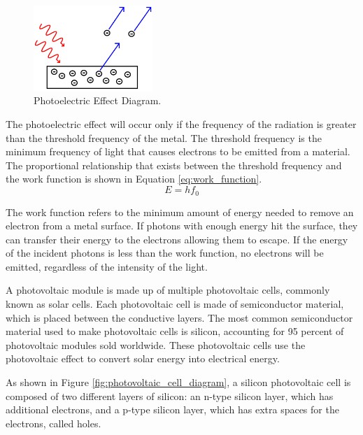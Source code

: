 \begin{figure}[ht]
    \centering
    \includegraphics[width=0.4\textwidth]{Figures/photoelectric_effect_diagram.png}
    \caption{Photoelectric Effect Diagram. \cite{KhanAcademyPhotoelectricEffect}}
    \label{fig:photoelectric_effect_diagram}
\end{figure}
\FloatBarrier

\noindent The photoelectric effect will occur only if the frequency of the radiation is greater than the threshold frequency of the metal. The threshold frequency is the minimum frequency of light that causes electrons to be emitted from a material. The proportional relationship that exists between the threshold frequency and the work function is shown in Equation \ref{eq:work_function}.
\begin{equation}
    E = hf_0
    \label{eq:work_function}
\end{equation}

\noindent The work function refers to the minimum amount of energy needed to remove an electron from a metal surface. If photons with enough energy hit the surface, they can transfer their energy to the electrons allowing them to escape. If the energy of the incident photons is less than the work function, no electrons will be emitted, regardless of the intensity of the light. \cite{ScienceABC2023PhotoelectricBeginners}\vspace{0.5em}

\noindent A photovoltaic module is made up of multiple photovoltaic cells, commonly known as solar cells. Each photovoltaic cell is made of semiconductor material, which is placed between the conductive layers. The most common semiconductor material used to make photovoltaic cells is silicon, accounting for 95 percent of photovoltaic modules sold worldwide. \cite{U.S.DEPARTMENTofENERGYSolarBasics} These photovoltaic cells use the photovoltaic effect to convert solar energy into electrical energy.\vspace{0.5em}

\noindent As shown in Figure \ref{fig:photovoltaic_cell_diagram}, a silicon photovoltaic cell is composed of two different layers of silicon: an n-type silicon layer, which has additional electrons, and a p-type silicon layer, which has extra spaces for the electrons, called holes.\par

